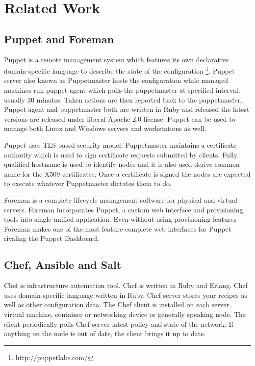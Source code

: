 \documentclass[a4paper,11pt]{kth-mag}
\begin{document}
\section{Related Work}
\label{sec:related}

\subsection{Puppet and Foreman}

Puppet is a remote management system which features its own declarative
domain-specific language to describe the state of the configuration
\footnote{http://puppetlabs.com/}. Puppet server also known as Puppetmaster
hosts the configuration while managed machines run puppet agent which polls
the puppetmaster at specified interval, usually 30 minutes. Taken actions
are then reported back to the puppetmaster. Puppet agent and puppetmaster
both are written in Ruby and released the latest versions are released under
liberal Apache 2.0 license. Puppet can be used to manage both Linux and
Windows servers and workstations as well.

Puppet uses TLS based security model:
Puppetmaster maintains a certificate authority which is used
to sign certificate requests submitted by clients.
Fully qualified hostname is used to identify nodes and
it is also used derive common name for the X509 certificates.
Once a certificate is signed the nodes are expected to
execute whatever Puppetmaster dictates them to do.

Foreman is a complete lifecycle management software for physical and virtual
servers. Foreman incorporates Puppet, a custom web interface and provisioning
tools into single unified application. Even without using provisioning features
Foreman makes one of the most feature-complete web interfaces for Puppet
rivaling the Puppet Dashboard.

\subsection{Chef, Ansible and Salt}

Chef is infrastructure automation tool. Chef is written in Ruby and Erlang.
Chef uses domain-specific language written in Ruby.
Chef server stores your recipes as well as other configuration data.
The Chef client is installed on each server, virtual machine, container
or networking device or generally speaking node.
The client periodically polls Chef server latest policy and
state of the network. If anything on the node is out of date,
the client brings it up to date. 
\end{document}
